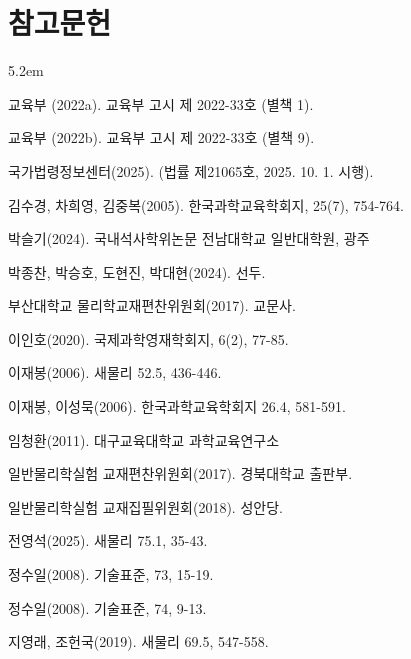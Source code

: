 \chapter*{참고문헌}
\vspace*{4em}
\begin{hangblock}{5.2em}


교육부 (2022a).
교육부 고시 제 2022-33호 (별책 1).

교육부 (2022b).
교육부 고시 제 2022-33호 (별책 9).

국가법령정보센터(2025).
 (법률 제21065호, 2025. 10. 1. 시행).

김수경, 차희영, 김중복(2005).
한국과학교육학회지, 25(7), 754-764.

박슬기(2024).
국내석사학위논문 전남대학교 일반대학원, 광주

박종찬, 박승호, 도현진, 박대현(2024).
선두.

부산대학교 물리학교재편찬위원회(2017).
교문사.

이인호(2020).
국제과학영재학회지, 6(2), 77-85.

이재봉(2006).
새물리 52.5, 436-446.

이재봉, 이성묵(2006).
한국과학교육학회지 26.4, 581-591.

임청환(2011).
대구교육대학교 과학교육연구소

일반물리학실험 교재편찬위원회(2017).
경북대학교 출판부.

일반물리학실험 교재집필위원회(2018).
성안당.

전영석(2025).
새물리 75.1, 35-43.

정수일(2008).
기술표준, 73, 15-19.

정수일(2008).
기술표준, 74, 9-13.

지영래, 조헌국(2019).
새물리 69.5, 547-558.


\end{hangblock}

